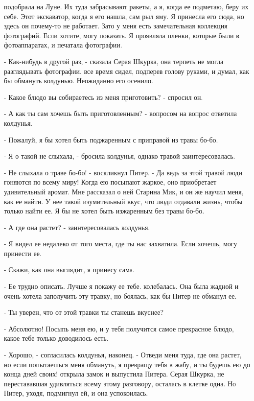 подобрала на Луне. Их туда забрасывают ракеты, а я, когда ее подметаю, 
беру их себе. Этот экскаватор, когда я его нашла, сам рыл яму. Я 
принесла его сюда, но здесь он почему-то не работает. Зато у меня есть 
замечательная коллекция фотографий. Если хотите, могу показать. Я 
проявляла пленки, которые были в фотоаппаратах, и печатала фотографии.
\par- Как-нибудь в другой раз, - сказала Серая Шкурка, она терпеть не 
могла разглядывать фотографии.
 все время сидел, подперев голову руками, и думал, как бы 
обмануть колдунью. Неожиданно его осенило.
\par- Какое блюдо вы собираетесь из меня приготовить? - спросил он.
\par- А как ты сам хочешь быть приготовленным? - вопросом на вопрос 
ответила колдунья.
\par- Пожалуй, я бы хотел быть поджаренным с приправой из травы бо-бо.
\par- Я о такой не слыхала, - бросила колдунья, однако травой 
заинтересовалась.
\par- Не слыхала о траве бо-бо! - воскликнул Питер. - Да ведь за этой 
травой люди гоняются по всему миру! Когда ею посыпают жаркое, оно 
приобретает удивительный аромат. Мне рассказал о ней Старина Мик, и он 
же научил меня, как ее найти. У нее такой изумительный вкус, что люди 
отдавали жизнь, чтобы только найти ее. Я бы не хотел быть изжаренным 
без травы бо-бо.
\par- А где она растет? - заинтересовалась колдунья.
\par- Я видел ее недалеко от того места, где ты нас захватила. Если 
хочешь, могу принести ее.
\par- Скажи, как она выглядит, я принесу сама.
\par- Ее трудно описать. Лучше я покажу ее тебе.
 колебалась. Она была жадной и очень хотела заполучить эту 
травку, но боялась, как бы Питер не обманул ее.
\par- Ты уверен, что от этой травки ты станешь вкуснее?
\par- Абсолютно! Посыпь меня ею, и у тебя получится самое прекрасное 
блюдо, какое тебе только доводилось есть.
\par- Хорошо, - согласилась колдунья, наконец. - Отведи меня туда, где 
она растет, но если попытаешься меня обмануть, я превращу тебя в жабу, 
и ты будешь ею до конца дней своих!
 открыла замок и выпустила Питера. Серая Шкурка, не 
перестававшая удивляться всему этому разговору, осталась в клетке 
одна. Но Питер, уходя, подмигнул ей, и она успокоилась.
